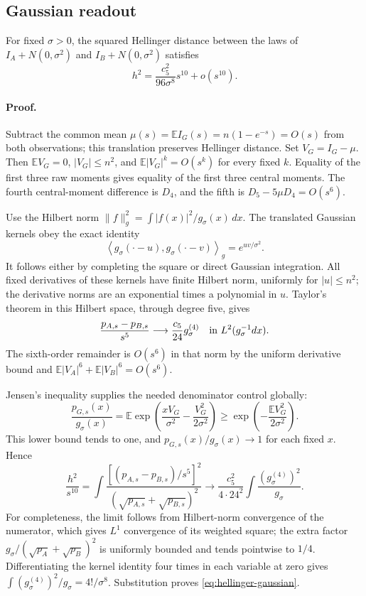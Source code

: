 \subsection{Gaussian readout}

For fixed $\sigma>0$, the squared Hellinger distance between the laws of
$I_A+N(0,\sigma^2)$ and $I_B+N(0,\sigma^2)$ satisfies
\begin{equation}\label{eq:hellinger-gaussian}
 \boxed{\displaystyle
 h^2=\frac{c_5^2}{96\sigma^8}s^{10}+o(s^{10}).}
\end{equation}

\paragraph{Proof.}
Subtract the common mean $\mu(s)=\mathbb E I_G(s)=n(1-e^{-s})=O(s)$ from
both observations; this translation preserves Hellinger distance.
Set $V_G=I_G-\mu$. Then $\mathbb E V_G=0$, $|V_G|\le n^2$, and
$\mathbb E|V_G|^k=O(s^k)$ for every fixed $k$. Equality of the first three
raw moments gives equality of the first three central moments. The fourth
central-moment difference is $D_4$, and the fifth is
$D_5-5\mu D_4=O(s^6)$.

Use the Hilbert norm $\|f\|_{g}^{2}=\int |f(x)|^2/g_\sigma(x)\,dx$.
The translated Gaussian kernels obey the exact identity
\[
 \left\langle g_\sigma(\cdot-u),g_\sigma(\cdot-v)\right\rangle_g
 =e^{uv/\sigma^2}.
\]
It follows either by completing the square or direct Gaussian integration.
All fixed derivatives of these kernels have finite Hilbert norm, uniformly
for $|u|\le n^2$; the derivative norms are an exponential times a polynomial
in $u$. Taylor's theorem in this Hilbert space, through degree five, gives
\[
 \frac{p_{A,s}-p_{B,s}}{s^5}
 \longrightarrow \frac{c_5}{24}g_\sigma^{(4)}
 \quad\hbox{in }L^2(g_\sigma^{-1}dx).
\]
The sixth-order remainder is $O(s^6)$ in that norm by the uniform derivative
bound and $\mathbb E|V_A|^6+\mathbb E|V_B|^6=O(s^6)$.

Jensen's inequality supplies the needed denominator control globally:
\[
 \frac{p_{G,s}(x)}{g_\sigma(x)}
 =\mathbb E\exp\left(\frac{xV_G}{\sigma^2}
                 -\frac{V_G^2}{2\sigma^2}\right)
 \ge \exp\left(-\frac{\mathbb E V_G^2}{2\sigma^2}\right).
\]
This lower bound tends to one, and $p_{G,s}(x)/g_\sigma(x)\to1$ for each
fixed $x$. Hence
\[
 \frac{h^2}{s^{10}}
 =\int\frac{[(p_{A,s}-p_{B,s})/s^5]^2}
                 {(\sqrt{p_{A,s}}+\sqrt{p_{B,s}})^2}
 \longrightarrow
 \frac{c_5^2}{4\cdot24^2}
 \int\frac{(g_\sigma^{(4)})^2}{g_\sigma}.
\]
For completeness, the limit follows from Hilbert-norm convergence of the
numerator, which gives $L^1$ convergence of its weighted square; the extra
factor $g_\sigma/(\sqrt{p_A}+\sqrt{p_B})^2$ is uniformly bounded and tends
pointwise to $1/4$. Differentiating the kernel identity four times in each
variable at zero gives
$\int(g_\sigma^{(4)})^2/g_\sigma=4!/\sigma^8$.
Substitution proves \eqref{eq:hellinger-gaussian}.

